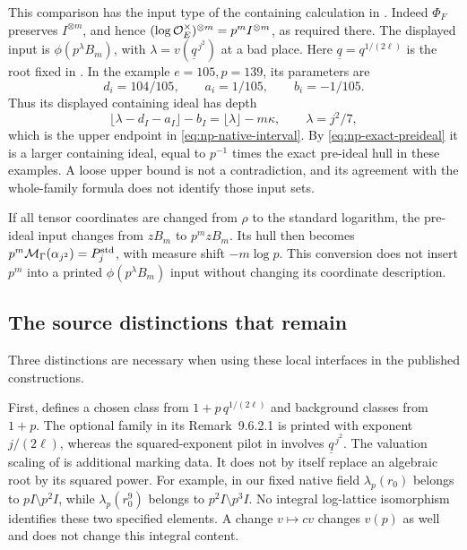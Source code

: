 This comparison has the input type of the containing
calculation in \cite[Proposition~1.2, PDF pp.~10--11;
Theorem~1.10, Step~(v), pp.~27--28]{IUT4}.
Indeed $\Phi_F$ preserves
$I^{\otimes m}$, and hence
$(\log\mathcal O_E^\times)^{\otimes m}=p^mI^{\otimes m}$,
as required there. The displayed input is
$\phi(p^\lambda B_m)$, with
$\lambda=v(\underline q^{\,j^2})$ at a bad place.
Here $\underline q=q^{1/(2\ell)}$ is the root fixed in
\cite[Example~3.2(iv), PDF p.~71]{IUT1}.
In the example $e=105,p=139$, its parameters are
\[
 d_i=104/105,\qquad a_i=1/105,\qquad b_i=-1/105.
\]
Thus its displayed containing ideal has depth
\[
 \lfloor\lambda-d_I-a_I\rfloor-b_I
       =\lfloor\lambda\rfloor-m\kappa,
       \qquad \lambda=j^2/7,
\]
which is the upper endpoint in
\eqref{eq:np-native-interval}. By
\eqref{eq:np-exact-preideal} it is a larger containing
ideal, equal to $p^{-1}$ times the exact pre-ideal hull
in these examples. A loose upper bound is not a
contradiction, and its agreement with the whole-family
formula does not identify those input sets.

If all tensor coordinates are changed from $\rho$
to the standard logarithm, the pre-ideal input changes
from $zB_m$ to $p^mzB_m$. Its hull then becomes
$p^m\mathcal M_\Gamma(\alpha_{j^2})=P_j^{\rm std}$,
with measure shift $-m\log p$. This conversion does
not insert $p^m$ into a printed $\phi(p^\lambda B_m)$
input without changing its coordinate description.

\subsection{The source distinctions that remain}

Three distinctions are necessary when using these local
interfaces in the published constructions.

First, \cite[\S9.6.2 and Theorem-Definition~9.8.1.1,
PDF pp.~109, 114--115]{JoshiIII} defines a chosen class
from $1+p\,q^{1/(2\ell)}$ and background classes from $1+p$.
The optional family in its Remark~9.6.2.1 is printed
with exponent $j/(2\ell)$, whereas the squared-exponent
pilot in \cite[Theorem~3.11; Remark~3.11.1(i)]{IUT3}
involves $\underline q^{\,j^2}$.
The valuation scaling of \cite[(4.2.2.2)]{JoshiIII}
is additional marking data. It does not by itself
replace an algebraic root by its squared power.
For example, in our fixed native field
$\lambda_p(r_0)$ belongs to $pI\setminus p^2I$,
while $\lambda_p(r_0^9)$ belongs to $p^2I\setminus p^3I$.
No integral log-lattice isomorphism identifies these
two specified elements. A change $v\mapsto cv$ changes
$v(p)$ as well and does not change this integral content.


